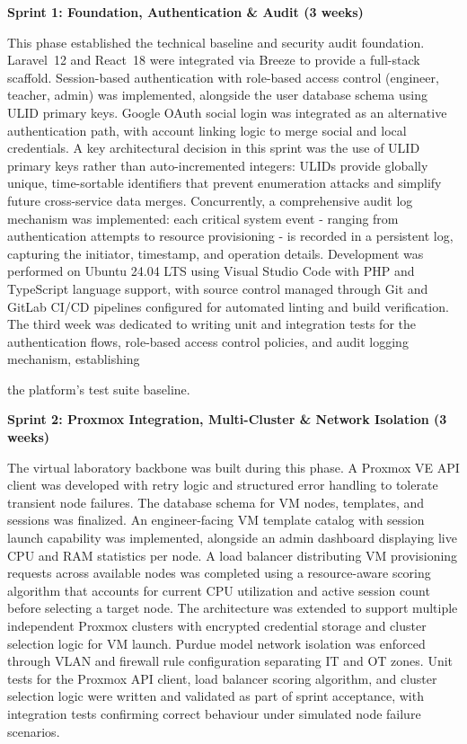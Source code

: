 \textbf{Sprint 1: Foundation, Authentication \& Audit (3 weeks)}

This phase established the technical baseline and security audit foundation.
Laravel~12 and React~18 were integrated via Breeze to provide a full-stack scaffold.
Session-based authentication with role-based access control (engineer, teacher, admin)
was implemented, alongside the user database schema using ULID primary keys. Google
OAuth social login was integrated as an alternative authentication path, with account
linking logic to merge social and local credentials. A key architectural decision in
this sprint was the use of ULID primary keys rather than auto-incremented integers:
ULIDs provide globally unique, time-sortable identifiers that prevent enumeration
attacks and simplify future cross-service data merges. Concurrently, a comprehensive
audit log mechanism was implemented: each critical system event - ranging from
authentication attempts to resource provisioning - is recorded in a persistent
log, capturing the initiator, timestamp, and operation details.
Development was performed on Ubuntu 24.04 LTS using Visual Studio Code with PHP and
TypeScript language support, with source control managed through Git and GitLab CI/CD
pipelines configured for automated linting and build verification. The third week was
dedicated to writing unit and integration tests for the authentication flows,
role-based access control policies, and audit logging mechanism, establishing

the platform's test suite baseline.

\textbf{Sprint 2: Proxmox Integration, Multi-Cluster \& Network Isolation (3 weeks)}

The virtual laboratory backbone was built during this phase. A Proxmox VE API client
was developed with retry logic and structured error handling to tolerate transient
node failures. The database schema for VM nodes, templates, and sessions was finalized.
An engineer-facing VM template catalog with session launch capability was implemented,
alongside an admin dashboard displaying live CPU and RAM statistics per node. A load
balancer distributing VM provisioning requests across available nodes was completed
using a resource-aware scoring algorithm that accounts for current CPU utilization and
active session count before selecting a target node. The architecture was extended to
support multiple independent Proxmox clusters with encrypted credential storage and
cluster selection logic for VM launch. Purdue model network isolation was enforced
through VLAN and firewall rule configuration separating IT and OT zones. Unit tests
for the Proxmox API client, load balancer scoring algorithm, and cluster selection
logic were written and validated as part of sprint acceptance, with integration tests
confirming correct behaviour under simulated node failure scenarios.

